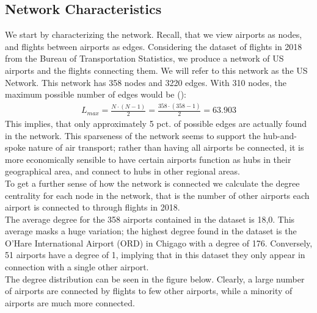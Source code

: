\label{sec:empirical}
\subsection{Network Characteristics}
We start by characterizing the network. Recall, that we view airports as nodes, and flights between airports as edges. Considering the dataset of flights in 2018 from the Bureau of Transportation Statistics, we produce a network of US airports and the flights connecting them. We will refer to this network as the US Network. This network has 358 nodes and 3220 edges. With 310 nodes, the maximum possible number of edges would be (\cite{Barabasi Networks}): 
\begin{align}
    L_{max}  = \frac{N\cdot(N-1)}{2}=\frac{358\cdot(358-1)}{2} = 63.903
\end{align}
This implies, that only approximately 5 pct. of possible edges are actually found in the network. 
This sparseness of the network seems to support the hub-and-spoke nature of air transport; rather than having all airports be connected, it is more economically sensible to have certain airports function as hubs in their geographical area, and connect to hubs in other regional areas. \\ 
To get a further sense of how the network is connected we calculate the degree centrality for each node in the network, that is the number of other airports each airport is connected to through flights in 2018. \\
The average degree for the 358 airports contained in the dataset is 18,0. This average masks a huge variation; the highest degree found in the dataset is the O'Hare International Airport (ORD) in Chigago with a degree of 176.  Conversely, 51 airports have a degree of 1, implying that in this dataset they only appear in connection with a single other airport. \\
The degree distribution can be seen in the figure below. Clearly, a large number of airports are connected by flights to few other airports, while a minority of airports are much more connected. \\

